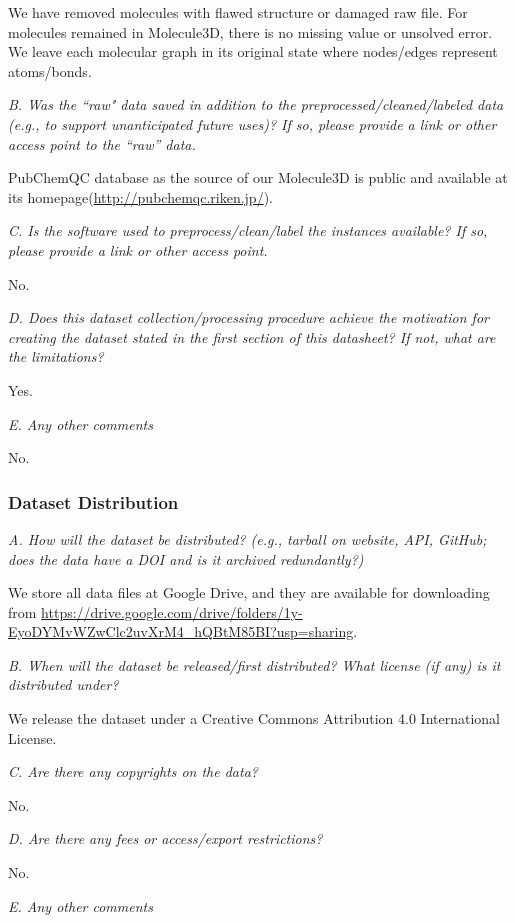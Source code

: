 \documentclass{article}
\begin{document}
We have removed molecules with flawed structure or damaged raw file. For molecules remained in Molecule3D, there is no missing value or unsolved error. We leave each molecular graph in its original state where nodes/edges represent atoms/bonds.

\textit{B. Was the ``raw" data saved in addition to the preprocessed/cleaned/labeled data (e.g., to support unanticipated future uses)? If so, please provide a link or other access point to the “raw” data.}

PubChemQC database as the source of our Molecule3D is public and available at its homepage(\url{http://pubchemqc.riken.jp/}).

\textit{C. Is the software used to preprocess/clean/label the instances available? If so, please provide a link or other access point.}

No.

\textit{D. Does this dataset collection/processing procedure achieve the motivation for creating the dataset stated in the first section of this datasheet? If not, what are the limitations?}

Yes.

\textit{E. Any other comments}

No.

\subsubsection{Dataset Distribution}

\textit{A. How will the dataset be distributed? (e.g., tarball on website, API, GitHub; does the data have a DOI and is it archived redundantly?)}

We store all data files at Google Drive, and they are available for downloading from \url{https://drive.google.com/drive/folders/1y-EyoDYMvWZwClc2uvXrM4\_hQBtM85BI?usp=sharing}.

\textit{B. When will the dataset be released/first distributed? What license (if any) is it distributed under?}

We release the dataset under a Creative Commons Attribution 4.0 International License.

\textit{C. Are there any copyrights on the data?}

No.

\textit{D. Are there any fees or access/export restrictions?}

No.

\textit{E. Any other comments}
\end{document}
